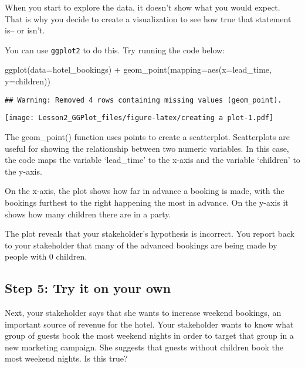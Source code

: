 \documentclass[
]{article}
\newenvironment{Shaded}{\begin{snugshade}}{\end{snugshade}}
\newcommand{\AttributeTok}[1]{\textcolor[rgb]{0.77,0.63,0.00}{#1}}
\newcommand{\FunctionTok}[1]{\textcolor[rgb]{0.00,0.00,0.00}{#1}}
\newcommand{\NormalTok}[1]{#1}
\newcommand{\SpecialCharTok}[1]{\textcolor[rgb]{0.00,0.00,0.00}{#1}}
\begin{document}
When you start to explore the data, it doesn't show what you would
expect. That is why you decide to create a visualization to see how true
that statement is-- or isn't.

You can use \texttt{ggplot2} to do this. Try running the code below:

\begin{Shaded}
\begin{Highlighting}[]
\FunctionTok{ggplot}\NormalTok{(}\AttributeTok{data=}\NormalTok{hotel\_bookings) }\SpecialCharTok{+}
  \FunctionTok{geom\_point}\NormalTok{(}\AttributeTok{mapping=}\FunctionTok{aes}\NormalTok{(}\AttributeTok{x=}\NormalTok{lead\_time, }\AttributeTok{y=}\NormalTok{children))}
\end{Highlighting}
\end{Shaded}

\begin{verbatim}
## Warning: Removed 4 rows containing missing values (geom_point).
\end{verbatim}

\texttt{[image: Lesson2\_GGPlot\_files/figure-latex/creating a plot-1.pdf]}

The geom\_point() function uses points to create a scatterplot.
Scatterplots are useful for showing the relationship between two numeric
variables. In this case, the code maps the variable `lead\_time' to the
x-axis and the variable `children' to the y-axis.

On the x-axis, the plot shows how far in advance a booking is made, with
the bookings furthest to the right happening the most in advance. On the
y-axis it shows how many children there are in a party.

The plot reveals that your stakeholder's hypothesis is incorrect. You
report back to your stakeholder that many of the advanced bookings are
being made by people with 0 children.

\hypertarget{step-5-try-it-on-your-own}{%
\subsection{Step 5: Try it on your
own}\label{step-5-try-it-on-your-own}}

Next, your stakeholder says that she wants to increase weekend bookings,
an important source of revenue for the hotel. Your stakeholder wants to
know what group of guests book the most weekend nights in order to
target that group in a new marketing campaign. She suggests that guests
without children book the most weekend nights. Is this true?
\end{document}
